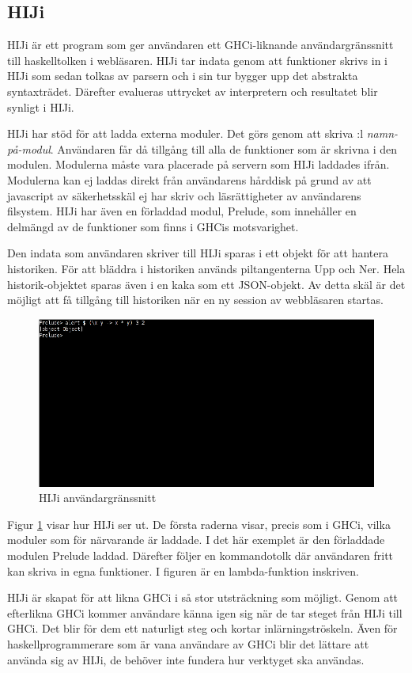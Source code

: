 \subsection{HIJi}

HIJi är ett program som ger användaren ett GHCi-liknande användargränssnitt till haskelltolken i webläsaren. 
HIJi tar indata genom att funktioner skrivs in i HIJi som sedan tolkas av parsern och i sin tur bygger upp det abstrakta syntaxträdet. Därefter evalueras uttrycket av interpretern och resultatet blir synligt i HIJi.

HIJi har stöd för att ladda externa moduler. Det görs genom att skriva :l \emph{namn-på-modul}. Användaren får då tillgång till alla de funktioner som är skrivna i den modulen. Modulerna måste vara placerade på servern som HIJi laddades ifrån. Modulerna kan ej laddas direkt från användarens hårddisk på grund av att javascript av säkerhetsskäl ej har skriv och läsrättigheter av användarens filsystem. HIJi har även en förladdad modul, Prelude, som innehåller en delmängd av de funktioner som finns i GHCis motsvarighet. 

Den indata som användaren skriver till HIJi sparas i ett objekt för att hantera historiken. För att bläddra i historiken används piltangenterna Upp och Ner. Hela historik-objektet sparas även i en kaka som ett JSON-objekt. Av detta skäl är det möjligt att få tillgång till historiken när en ny session av webbläsaren startas.

\begin{figure}[H]
    \begin{center}
        \includegraphics[width=1\textwidth]{hiji_screen3.png}
        \caption{HIJi användargränssnitt}
        \label{fig:hiji} %
    \end{center}
\end{figure}

Figur \ref{fig:hiji} visar hur HIJi ser ut. De första raderna visar, precis som i GHCi, vilka moduler som för närvarande är laddade. I det här exemplet är den förladdade modulen Prelude laddad. Därefter följer en kommandotolk där användaren fritt kan skriva in egna funktioner. I figuren är en lambda-funktion inskriven.

HIJi är skapat för att likna GHCi i så stor utsträckning som möjligt.
Genom att efterlikna GHCi kommer användare känna igen sig när de tar steget från HIJi till GHCi. Det blir för dem ett naturligt steg och kortar inlärningströskeln. Även för haskellprogrammerare som är vana användare av GHCi blir det lättare att använda sig av HIJi, de behöver inte fundera hur verktyget ska användas.
